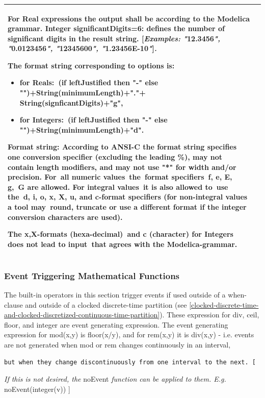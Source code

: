 \documentclass[10pt,a4paper]{report}
\def\doublelabel#1{\label{#1}\hypertarget{#1}{}}
\begin{document}
\begin{longtable}{|p{5cm}|p{8cm}|}
For Real expressions the output shall be according to the Modelica
grammar. Integer significantDigits=6: defines the number of significant
digits in the result string. {[}\emph{Examples: "}12.3456\emph{",
"}0.0123456\emph{", "}12345600\emph{", "}1.23456E-10\emph{"}{]}\emph{.}

The format string corresponding to options is:

\begin{itemize}
\item
  for Reals:~(if leftJustified then "-" else
  "")+String(minimumLength)+"."+ String(signficantDigits)+"g",
\item
  for Integers:~(if leftJustified then "-" else
  "")+String(minimumLength)+"d".
\end{itemize}

Format string: According to ANSI-C the format string specifies one
conversion specifier (excluding the leading \%), may not contain length
modifiers, and may not use "*" for width and/or precision. For~all
numeric values~the~format specifiers~f, e, E, g,~G are allowed. For
integral values~it is also allowed to~use the~d, i, o, x, X, u, and
c-format specifiers (for non-integral values a tool may~round, truncate
or use a different format if the integer conversion characters are
used).

The x,X-formats (hexa-decimal)~and c (character) for Integers does not
lead to input~that agrees with the Modelica-grammar.\\ \hline
\end{longtable}

\subsubsection{Event Triggering Mathematical Functions}\doublelabel{event-triggering-mathematical-functions}

The built-in operators in this section trigger events if used outside of
a when-clause and outside of a clocked discrete-time partition (see
\ref{clocked-discrete-time-and-clocked-discretized-continuous-time-partition}). 
These expression for div, ceil, floor, and integer are
event generating expression. The event generating expression for
mod(x,y) is floor(x/y), and for rem(x,y) it is div(x,y) - i.e. events
are not generated when mod or rem changes continuously in an interval,
\begin{lstlisting}[language=modelica]
  but when they change discontinuously from one interval to the next. [
\end{lstlisting}
\emph{If this is not desired, the} noEvent \emph{function can be applied
to them. E.g.} noEvent(integer(v)) {]}
\end{document}
